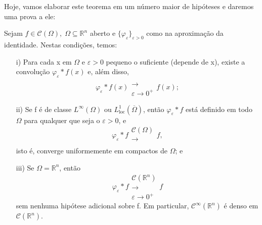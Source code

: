 \documentclass[../distribution_theory_notes.tex]{subfiles}
\begin{document}
Hoje, vamos elaborar este teorema em um número maior de hipóteses e daremos uma prova a ele: 
\hypertarget{density_theorem}{ \begin{theorem*}
    Sejam \(f\in \mathcal{C}(\Omega ),\; \Omega \subseteq \mathbb{R}^{n}\) aberto e \(\{\varphi_{\varepsilon }\}_{\varepsilon >0}\) como na aproximação da identidade. Nestas condições, temos:
   \begin{itemize}
     \item[i)] Para cada x em \(\Omega \) e \(\varepsilon >0\) pequeno o suficiente (depende de x), existe a convolução \(\varphi_\varepsilon *f(x)\) e, além disso, 
       \[
         \varphi_\varepsilon *f(x)\substack{ \\ \longrightarrow \\ \varepsilon\to0^{+}}f(x);
       \]
       \item[ii)] Se f é de classe \(L^{\infty}(\Omega )\) ou \(L_{\mathrm{loc}}^{1}(\overline{\Omega })\), então \(\varphi_\varepsilon *f\) está definido em todo \(\Omega \) para qualquer que seja o \(\varepsilon >0\), e 
         \[
           \varphi_\varepsilon *f \substack{\mathcal{C}(\Omega ) \\ \longrightarrow \\ }f,
         \]
         isto é, converge uniformemente em compactos de \(\Omega \); e
         \item[iii)] Se \(\Omega =\mathbb{R}^{n}\), então 
           \[
             \varphi _\varepsilon *f \substack{ \mathcal{C}(\mathbb{R}^{n})\\ \longrightarrow \\ \varepsilon \to0^{+}}f
           \]
           sem nenhuma hipótese adicional sobre f. Em particular, \(\mathcal{C}^{\infty}(\mathbb{R}^{n})\) é denso em \(\mathcal{C}(\mathbb{R}^{n})\).
   \end{itemize}
\end{theorem*}}
\end{document}
